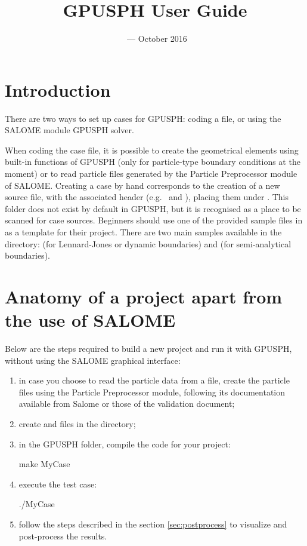\documentclass{../GPUSPHtemplate}
\title{GPUSPH User Guide}
\author{}
\date{\currentver\ --- October 2016}
\begin{document}
\maketitle
\tableofcontents
\newpage
\section{Introduction}

There are two ways to set up cases for GPUSPH: coding a  file,
or using the SALOME module GPUSPH solver.

When coding the case file, it is possible to create the geometrical elements
using built-in functions of GPUSPH
(only for particle-type boundary conditions at the moment) or to read particle
files generated by the Particle Preprocessor module of SALOME.
Creating a case by hand corresponds to the creation of a new \cu source file, with
the associated header (e.g.\  and ),
placing them under . This folder does not exist by default in GPUSPH,
but it is recognised as a place to be scanned for case sources.
Beginners should use one of the provided sample files in  
as a template for their project.
There are two main samples available in the  directory: 
 (for Lennard-Jones or dynamic boundaries) 
and  (for semi-analytical boundaries).

\section{Anatomy of a project apart from the use of SALOME}

Below are the steps required to build a new project and run it with GPUSPH, without
using the SALOME graphical interface:
\begin{enumerate}
\item in case you choose to read the particle data from a file, create the particle
  files using the Particle Preprocessor module, following its documentation available from Salome
  or those of the validation document;
\item create  and  files in 
the  directory;
\item in the GPUSPH folder, compile the code for your project:
\begin{shellcode}
make MyCase
\end{shellcode}
\item execute the test case:
\begin{shellcode}
./MyCase
\end{shellcode}
\item follow the steps described in the section \ref{sec:postprocess} 
to visualize and post-process the results.
\end{enumerate}
\end{document}
